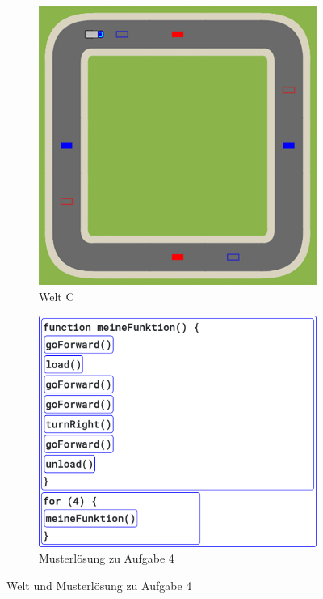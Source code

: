 \begin{figure}[H]
  \begin{subfigure}[b]{0.40\textwidth}
    \includegraphics[width=\textwidth]{gfx/exercises-world-c.png}
    \caption{Welt C}
  \end{subfigure}\hfill
  \begin{subfigure}[b]{0.40\textwidth}
    \includegraphics[width=\textwidth]{gfx/exercises-program-4.png}
    \caption{Musterlösung zu Aufgabe 4}
  \end{subfigure}\hfill
  \caption{Welt und Musterlösung zu Aufgabe 4}
\end{figure}

